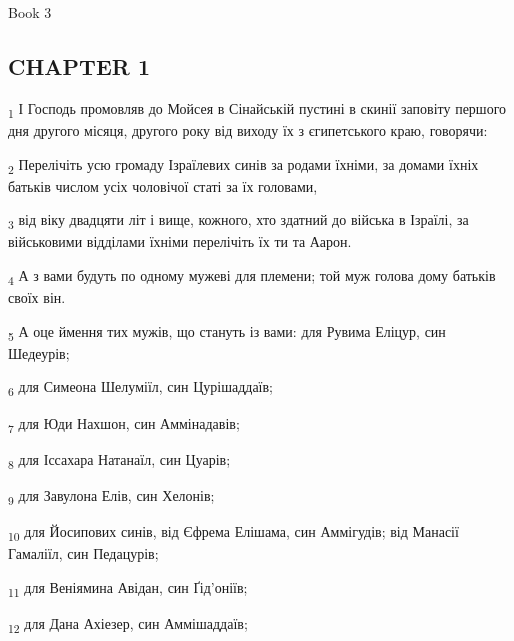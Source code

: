 Book 3
\subsection{CHAPTER 1}
\begin{tcolorbox}
\textsubscript{1} І Господь промовляв до Мойсея в Сінайській пустині в скинії заповіту першого дня другого місяця, другого року від виходу їх з єгипетського краю, говорячи:
\end{tcolorbox}
\begin{tcolorbox}
\textsubscript{2} Перелічіть усю громаду Ізраїлевих синів за родами їхніми, за домами їхніх батьків числом усіх чоловічої статі за їх головами,
\end{tcolorbox}
\begin{tcolorbox}
\textsubscript{3} від віку двадцяти літ і вище, кожного, хто здатний до війська в Ізраїлі, за військовими відділами їхніми перелічіть їх ти та Аарон.
\end{tcolorbox}
\begin{tcolorbox}
\textsubscript{4} А з вами будуть по одному мужеві для племени; той муж голова дому батьків своїх він.
\end{tcolorbox}
\begin{tcolorbox}
\textsubscript{5} А оце ймення тих мужів, що стануть із вами: для Рувима Еліцур, син Шедеурів;
\end{tcolorbox}
\begin{tcolorbox}
\textsubscript{6} для Симеона Шелуміїл, син Цурішаддаїв;
\end{tcolorbox}
\begin{tcolorbox}
\textsubscript{7} для Юди Нахшон, син Аммінадавів;
\end{tcolorbox}
\begin{tcolorbox}
\textsubscript{8} для Іссахара Натанаїл, син Цуарів;
\end{tcolorbox}
\begin{tcolorbox}
\textsubscript{9} для Завулона Елів, син Хелонів;
\end{tcolorbox}
\begin{tcolorbox}
\textsubscript{10} для Йосипових синів, від Єфрема Елішама, син Аммігудів; від Манасії Гамаліїл, син Педацурів;
\end{tcolorbox}
\begin{tcolorbox}
\textsubscript{11} для Веніямина Авідан, син Ґід'оніїв;
\end{tcolorbox}
\begin{tcolorbox}
\textsubscript{12} для Дана Ахіезер, син Аммішаддаїв;
\end{tcolorbox}
